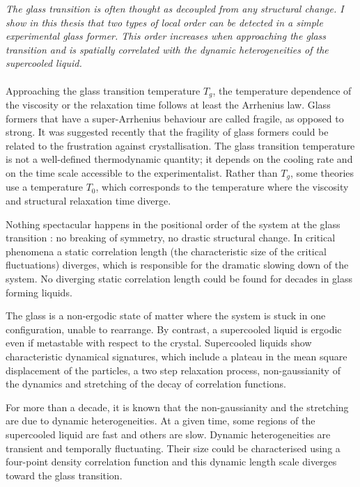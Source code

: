 \label{ch:abstract}

\emph{The glass transition is often thought as decoupled from any structural change. I show in this thesis that two types of local order can be detected in a simple experimental glass former. This order increases when approaching the glass transition and is spatially correlated with the dynamic heterogeneities of the supercooled liquid.}


\paragraph{}
Approaching the glass transition temperature $T_g$, the temperature dependence of the viscosity or the relaxation time follows at least the Arrhenius law. Glass formers that have a super-Arrhenius behaviour are called fragile, as opposed to strong. It was suggested recently that the fragility of glass formers could be related to the frustration against crystallisation. The glass transition temperature is not a well-defined thermodynamic quantity; it depends on the cooling rate and on the time scale accessible to the experimentalist. Rather than $T_g$, some theories use a temperature $T_0$, which corresponds to the temperature where the viscosity and structural relaxation time diverge.

Nothing spectacular happens in the positional order of the system at the glass transition : no breaking of symmetry, no drastic structural change. In critical phenomena a static correlation length (the characteristic size of the critical fluctuations) diverges, which is responsible for the dramatic slowing down of the system. No diverging static correlation length could be found for decades in glass forming liquids.

The glass is a non-ergodic state of matter where the system is stuck in one configuration, unable to rearrange. By contrast, a supercooled liquid is ergodic even if metastable with respect to the crystal. Supercooled liquids show characteristic dynamical signatures, which include a plateau in the mean square displacement of the particles, a two step relaxation process, non-gaussianity of the dynamics and stretching of the decay of correlation functions.

For more than a decade, it is known that the non-gaussianity and the stretching are due to dynamic heterogeneities. At a given time, some regions of the supercooled liquid are fast and others are slow. Dynamic heterogeneities are transient and temporally fluctuating. Their size could be characterised using a four-point density correlation function and this dynamic length scale diverges toward the glass transition.

